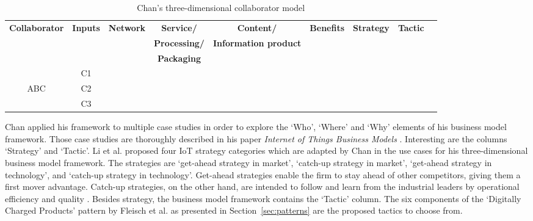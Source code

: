		\begin{table}[!htb]
			\scriptsize
			\centering			
			\caption{Chan's three-dimensional collaborator model \cite{chan}}
			\label{tab:chan}
			\centering
			\vspace{0.2cm}
			\renewcommand{\arraystretch}{1.5}

			\begin{tabular}{| c | c | c | c | c | c | c | c | c |}

				\hline
				\rule{0pt}{8pt}
				\textbf{Collaborator} & \textbf{Inputs} & \textbf{Network} & \textbf{Service/}    & \textbf{Content/}            & \textbf{Benefits} & \textbf{Strategy} & \textbf{Tactic}\\
				                      &                 &                  & \textbf{Processing/} & \textbf{Information product} &                   &                   & \\
				                      &                 &                  & \textbf{Packaging}   &                              &                   &                   & \\         
				\hline
				        			& C1          		&        			& 			    	&                     &                              &          		& \\
				ABC     			& C2          		&        			&         			&                     &                              &          		& \\
				        			& C3          		&        			&         			&                     &                              &          		& \\
				\hline
			\end{tabular}
		\end{table}

		Chan applied his framework to multiple case studies in order to explore the `Who', `Where' and `Why' elements of his business model framework. Those case studies are thoroughly described in his paper \emph{Internet of Things Business Models} \cite{chan}. Interesting are the columns `Strategy' and `Tactic'. Li et al. \cite{li} proposed four IoT strategy categories which are adapted by Chan in the use cases for his three-dimensional business model framework. The strategies are `get-ahead strategy in market', `catch-up strategy in market', `get-ahead strategy in technology', and `catch-up strategy in technology'. Get-ahead strategies enable the firm to stay ahead of other competitors, giving them a first mover advantage. Catch-up strategies, on the other hand, are intended to follow and learn from the industrial leaders by operational efficiency and quality \cite{chan}.
		Besides strategy, the business model framework contains the `Tactic' column. The six components of the `Digitally Charged Products' pattern by Fleisch et al. \cite{fleisch} as presented in Section~\ref{sec:patterns} are the proposed tactics to choose from.
%
